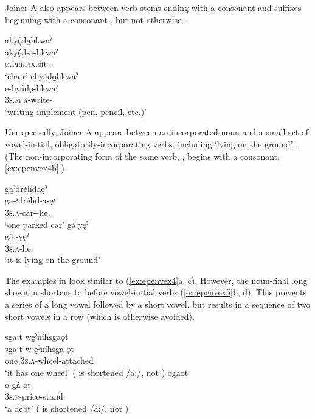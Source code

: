 Joiner A also appears between verb stems ending with a consonant and suffixes beginning with a consonant , but not otherwise .

\ea\label{ex:epenvex6} 
\ea akyę́da̱hkwaˀ\\\label{ex:epenvex6a}
\gll akyę́d-a-hkwaˀ\\
 \textsc{ø.prefix}.sit-{\joinerA}-{\instrumental}\\
\glt `chair'
\ex ehyádǫ̱hkwaˀ\\\label{ex:epenvex6b}
\gll e-hyádǫ̱-hkwaˀ\\
 \textsc{3s.fi.a}-write-{\instrumental}\\
\glt `writing implement (pen, pencil, etc.)'
\z
\z

Unexpectedly, Joiner A appears between an incorporated noun and a small set of vowel-initial, obligatorily-incorporating verbs, including  ‘lying on the ground’ . (The non-incorporating form of the same verb, , begins with a consonant,  \ref{ex:epenvex4b}.)

\ea\label{ex:epenvex4} 
\ea ga̱ˀdréhdaęˀ\\\label{ex:epenvex4a}
\gll ga̱-ˀdréhd-a-ęˀ\\
 \textsc{3s.a}-car-{\joinerA}-lie.{\stative}\\
\glt `one parked car'
\ex gá:yęˀ\\\label{ex:epenvex4b}
\gll gá:-yęˀ\\
 \textsc{3s.a}-lie.{\stative}\\
\glt `it is lying on the ground'
\z
\z

The examples in  look similar to (\ref{ex:epenvex4}a, c). However, the noun-final long  shown in  shortens to  before vowel-initial verbs (\ref{ex:epenvex5}b, d). This prevents a series of a long vowel followed by a short vowel, but results in a sequence of two short vowels in a row (which is otherwise avoided).
 
\ea\label{ex:epenvex5} 
\ea sga:t wę̱ˀníhsgaǫt \\
\gll sga:t w-ę̱ˀníhsga-ǫt\\
one  \textsc{3s.a}-wheel-attached \\
\glt ‘it has one wheel’ ( is shortened /a:/, not )
\ex ogaot\\
\gll o-gá-ot\\
\textsc{3s.p}-price-stand.{\stative} \\
\glt `a debt' ( is shortened /a:/, not )
\z
\z


